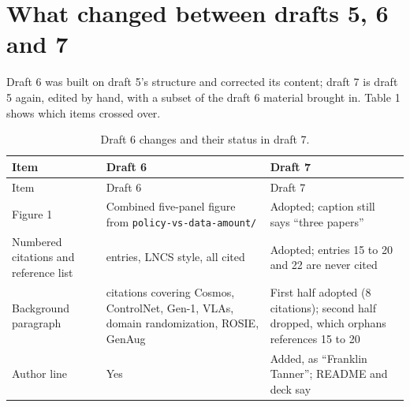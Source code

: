 \documentclass[
  11pt,
]{article}
\begin{document}
\section{What changed between drafts 5, 6 and
7}\label{what-changed-between-drafts-5-6-and-7}

Draft 6 was built on draft 5's structure and corrected its content;
draft 7 is draft 5 again, edited by hand, with a subset of the draft 6
material brought in. Table 1 shows which items crossed over.

\begin{longtable}[]{@{}
  >{\raggedright\arraybackslash}p{}
  >{\raggedright\arraybackslash}p{}
  >{\raggedright\arraybackslash}p{}@{}}
\caption{Draft 6 changes and their status in draft 7.}\tabularnewline
\toprule\noalign{}
\begin{minipage}[b]{\linewidth}\raggedright
Item
\end{minipage} & \begin{minipage}[b]{\linewidth}\raggedright
Draft 6
\end{minipage} & \begin{minipage}[b]{\linewidth}\raggedright
Draft 7
\end{minipage} \\
\midrule\noalign{}
\endfirsthead
\toprule\noalign{}
\begin{minipage}[b]{\linewidth}\raggedright
Item
\end{minipage} & \begin{minipage}[b]{\linewidth}\raggedright
Draft 6
\end{minipage} & \begin{minipage}[b]{\linewidth}\raggedright
Draft 7
\end{minipage} \\
\midrule\noalign{}
\endhead
\bottomrule\noalign{}
\endlastfoot
Figure 1 & Combined five-panel figure from
\texttt{policy-vs-data-amount/} & Adopted; caption still says ``three
papers'' \\
Numbered citations and reference list & 27 entries, LNCS style, all
cited & Adopted; entries 15 to 20 and 22 are never cited \\
Background paragraph & 14 citations covering Cosmos, ControlNet, Gen-1,
VLAs, domain randomization, ROSIE, GenAug & First half adopted (8
citations); second half dropped, which orphans references 15 to 20 \\
Author line & Yes & Added, as ``Franklin Tanner''; README and deck say

\end{longtable}
\end{document}
